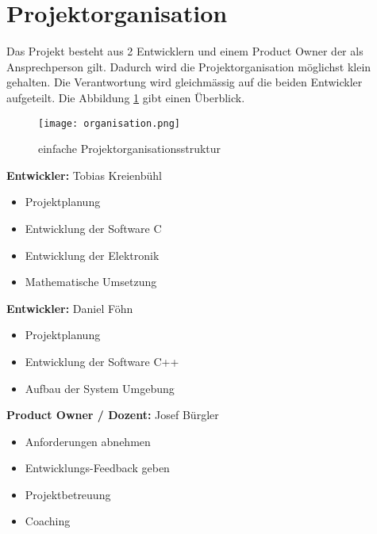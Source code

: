 \section{Projektorganisation}
    Das Projekt besteht aus 2 Entwicklern und einem Product Owner der als Ansprechperson gilt. Dadurch wird die Projektorganisation möglichst klein gehalten. Die Verantwortung wird gleichmässig auf die beiden Entwickler aufgeteilt. Die Abbildung \ref{fig:projektorganisation} gibt einen Überblick.
    \begin{figure}[H]
        \centering
        \texttt{[image: organisation.png]}
        \caption{einfache Projektorganisationsstruktur}
        \label{fig:projektorganisation}
    \end{figure}
	\noindent\textbf{Entwickler:} Tobias Kreienbühl
    \begin{itemize}
        \item Projektplanung
        \item Entwicklung der Software C
        \item Entwicklung der Elektronik
        \item Mathematische Umsetzung
    \end{itemize}
    \vspace{.5cm}
    \textbf{Entwickler:} Daniel Föhn
    \begin{itemize}
        \item Projektplanung
        \item Entwicklung der Software C++
        \item Aufbau der System Umgebung
    \end{itemize}
    \vspace{.5cm}
    \textbf{Product Owner / Dozent:} Josef Bürgler
    \begin{itemize}
        \item Anforderungen abnehmen
        \item Entwicklungs-Feedback geben
        \item Projektbetreuung
        \item Coaching
    \end{itemize}